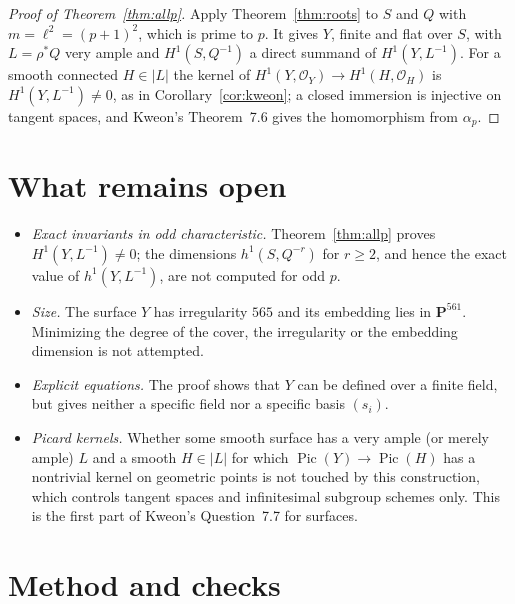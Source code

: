 \documentclass[11pt,a4paper]{article}
\theoremstyle{plain}
\theoremstyle{remark}
\newcommand{\OO}{\mathcal O}
\newcommand{\PP}{\mathbf P}
\newcommand{\Pic}{\operatorname{Pic}}
\begin{document}
\begin{proof}[Proof of Theorem~\ref{thm:allp}]
Apply Theorem~\ref{thm:roots} to $S$ and $Q$ with $m=\ell^2=(p+1)^2$, which is prime to $p$. It gives $Y$, finite and
flat over $S$, with $L=\rho^*Q$ very ample and $H^1(S,Q^{-1})$ a direct summand of $H^1(Y,L^{-1})$. For a smooth
connected $H\in|L|$ the kernel of $H^1(Y,\OO_Y)\to H^1(H,\OO_H)$ is $H^1(Y,L^{-1})\neq0$, as in
Corollary~\ref{cor:kweon}; a closed immersion is injective on tangent spaces, and Kweon's Theorem~7.6 gives the
homomorphism from $\alpha_p$.
\end{proof}

\section{What remains open}

\begin{itemize}
\item \emph{Exact invariants in odd characteristic.} Theorem~\ref{thm:allp} proves
$H^1(Y,L^{-1})\ne0$; the dimensions $h^1(S,Q^{-r})$ for $r\geq2$, and hence the exact value of $h^1(Y,L^{-1})$, are not
computed for odd $p$.
\item \emph{Size.} The surface $Y$ has irregularity $565$ and its embedding lies in $\PP^{561}$. Minimizing the degree
of the cover, the irregularity or the embedding dimension is not attempted.
\item \emph{Explicit equations.} The proof shows that $Y$ can be defined over a finite field, but gives neither a
specific field nor a specific basis $(s_i)$.
\item \emph{Picard kernels.} Whether some smooth surface has a very ample (or merely ample) $L$ and a smooth
$H\in|L|$ for which $\Pic(Y)\to\Pic(H)$ has a nontrivial kernel on geometric points is not touched by this
construction, which controls tangent spaces and infinitesimal subgroup schemes only. This is the first part of
Kweon's Question~7.7 \cite[p.~19]{Kweon} for surfaces.
\end{itemize}

\section*{Method and checks}
\end{document}
